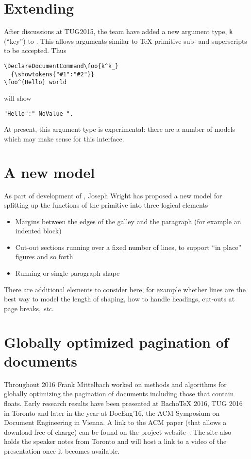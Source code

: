 \documentclass{ltnews}
\begin{document}
\section{Extending }

After discussions at TUG2015, the team have added a new argument type,
\texttt{k} (\enquote{key}) to . This allows arguments similar
to \TeX{} primitive sub- and superscripts to be accepted. Thus
\begin{verbatim}
\DeclareDocumentCommand\foo{k^k_}
  {\showtokens{"#1":"#2"}}
\foo^{Hello} world
\end{verbatim}
will show
\begin{verbatim}
"Hello":"-NoValue-".
\end{verbatim}

At present, this argument type is experimental: there are a number of models
which may make sense for this interface.

\section{A new  model}

As part of development of , Joseph Wright has proposed a new
model for splitting up the functions of the  primitive into three
logical elements
\begin{itemize}
  \item Margins between the edges of the galley and the paragraph (for example
    an indented block)
  \item Cut-out sections running over a fixed number of lines, to support
    \enquote{in place} figures and so forth
  \item Running or single-paragraph shape
\end{itemize}

There are additional elements to consider here, for example whether lines are
the best way to model the length of shaping, how to handle headings, cut-outs
at page breaks, \emph{etc.}


\section{Globally optimized pagination of documents}

Throughout 2016 Frank Mittelbach worked on methods and algorithms for
globally optimizing the pagination of documents including those that
contain floats. Early research results have been presented at Bacho\TeX{}
2016, TUG 2016 in Toronto and later in the year at \mbox{DocEng'16}, the ACM
Symposium on Document Engineering in Vienna. A link to the ACM paper
(that allows a download free of charge) can be found on the project
website~\cite{project-publications}. The site also holds the speaker
notes from Toronto and will host a link to a video of the
presentation once it becomes available.
\end{document}
